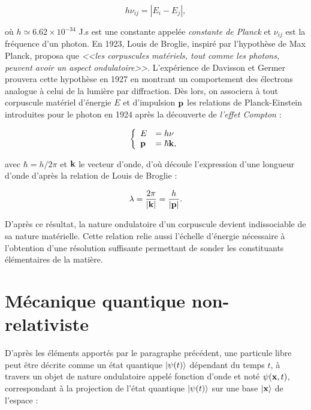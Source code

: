             \begin{equation}
                h\nu_{ij}=|E_i-E_j|,
            \end{equation}
            
        où $h\simeq6.62\times10^{-34}$ J.s est une constante appelée \textit{constante de Planck} et $\nu_{ij}$ est la fréquence d'un photon. En 1923, Louis de Broglie, inspiré par l'hypothèse de Max Planck, proposa  que \textit{<<les corpuscules matériels, tout comme les photons, peuvent avoir un aspect ondulatoire>>}. L'expérience de Davisson et Germer \cite{Germer1927} prouvera cette hypothèse en 1927 en montrant un comportement des électrons analogue à celui de la lumière par diffraction. Dès lors, on associera à tout corpuscule matériel d'énergie $E$ et d'impulsion $\vb{p}$ les relations de Planck-Einstein introduites pour le photon en 1924 après la découverte de \textit{l'effet Compton} \cite{Compton1923} :
            
            \begin{equation}
                \left\{
                    \begin{array}{ll}
                        E & = h\nu \\
                        \vb{p} & = \hbar\vb{k},
                    \end{array}
                \right.
            \end{equation}

            avec $\hbar=h/2\pi$ et $\vb{k}$ le vecteur d'onde, d'où découle l'expression d'une longueur d'onde d'après la relation de Louis de Broglie :
            
            \begin{equation}
                \lambda=\frac{2\pi}{|\vb{k}|}=\frac{h}{|\vb{p}|}.
                \label{deBroglie}
            \end{equation}
            
        D'après ce résultat, la nature ondulatoire d'un corpuscule devient indissociable de sa nature matérielle. Cette relation relie aussi l'échelle d'énergie nécessaire à l'obtention d'une résolution suffisante permettant de sonder les constituants élémentaires de la matière.
        
        \section{Mécanique quantique non-relativiste}
        
         D'après les éléments apportés par le paragraphe précédent, une particule libre peut être décrite comme un état quantique $\ket{\psi(t)}$ dépendant du temps $t$, à travers un objet de nature ondulatoire appelé fonction d'onde et noté $\psi(\vb{x},t)$, correspondant à la projection de l'état quantique $\ket{\psi(t)}$ sur une base $\ket{\vb{x}}$ de l'espace :
        
